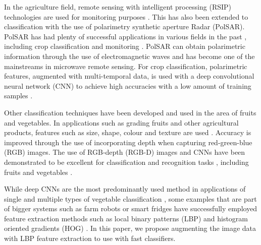 In the agriculture field, remote sensing with intelligent processing (RSIP) technologies are used for monitoring purposes \cite{b2_1}. This has also been extended to classification with the use of polarimetry synthetic aperture Radar (PolSAR). PolSAR has had plenty of successful applications in various fields in the past \cite{b2_2,b2_3,b2_4}, including crop classification and monitoring \cite{b2_5,b2_6}. PolSAR can obtain polarimetric information through the use of electromagnetic waves and has become one of the mainstreams in microwave remote sensing. For crop classification, polarimetric features, augmented with multi-temporal data, is used with a deep convolutional neural network (CNN) to achieve high accuracies with a low amount of training samples \cite{b2_7}.

Other classification techniques have been developed and used in the area of fruits and vegetables. In applications such as grading fruits and other agricultural products, features such as size, shape, colour and texture are used \cite{b2_8,b2_9,b2_10}. Accuracy is improved through the use of incorporating depth when capturing red-green-blue (RGB) images. The use of RGB-depth (RGB-D) images and CNNs have been demonstrated to be excellent for classification and recognition tasks \cite{b2_11,b2_12}, including fruits and vegetables \cite{b2_13}.

While deep CNNs are the most predominantly used method in applications of single and multiple types of vegetable classification \cite{b2_14,b2_15,b2_16}, some examples that are part of bigger systems such as farm robots \cite{b2_17} or smart fridges \cite{b2_18} have successfully employed feature extraction methods such as local binary patterns (LBP) and histogram oriented gradients (HOG) \cite{b2_19,b2_20}. In this paper, we propose augmenting the image data with LBP feature extraction to use with fast classifiers.